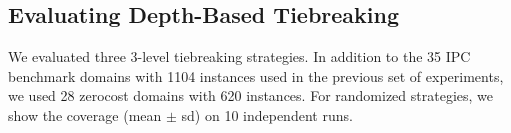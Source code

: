 

\subsection{Evaluating Depth-Based Tiebreaking}
\label{sec:depth-based-evaluation}
We evaluated three 3-level tiebreaking strategies.
% 
In addition to the 35 IPC benchmark domains with 1104 instances used in
the previous set of experiments, we used 28 zerocost domains with 620
instances. For randomized strategies, we
show the coverage (mean $\pm$ sd) on
10 independent runs.


